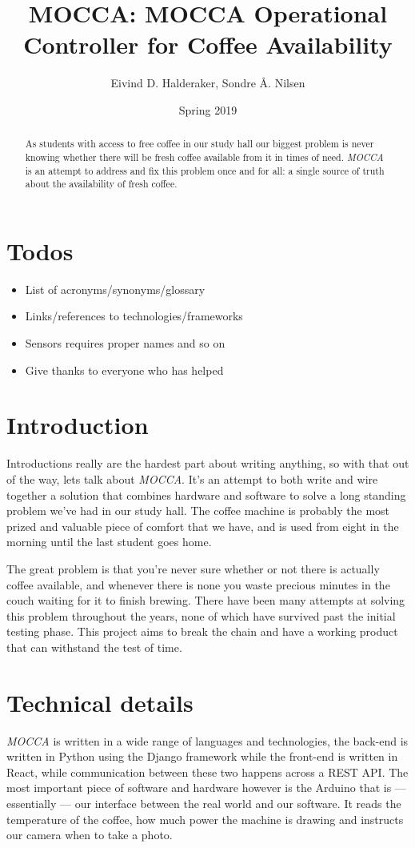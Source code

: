 \documentclass[12pt,a4paper,oneside,article]{memoir}
\title{MOCCA: MOCCA Operational Controller for Coffee Availability}
\author{Eivind D. Halderaker, Sondre Å. Nilsen}
\date{Spring 2019}
\numberwithin{equation}{chapter}
\begin{document}
\maketitle
\tableofcontents

\begin{abstract}
  As students with access to free coffee in our study hall our biggest problem
  is never knowing whether there will be fresh coffee available from it in times
  of need. \textit{MOCCA} is an attempt to address and fix this problem once and
  for all: a single source of truth about the availability of fresh coffee.
\end{abstract}

\section{Todos}
\begin{itemize}
\item List of acronyms/synonyms/glossary
\item Links/references to technologies/frameworks
\item Sensors requires proper names and so on
\item Give thanks to everyone who has helped
\end{itemize}

\section{Introduction}\label{sec:introduction}
Introductions really are the hardest part about writing anything, so with that
out of the way, lets talk about \textit{MOCCA}. It's an attempt to both write
and wire together a solution that combines hardware and software to solve a long
standing problem we've had in our study hall. The coffee machine is probably the
most prized and valuable piece of comfort that we have, and is used from eight
in the morning until the last student goes home.

The great problem is that you're never sure whether or not there is actually
coffee available, and whenever there is none you waste precious minutes in the
couch waiting for it to finish brewing. There have been many attempts at solving
this problem throughout the years, none of which have survived past the initial
testing phase. This project aims to break the chain and have a working product
that can withstand the test of time.

\section{Technical details}\label{sec:technical-details}
\textit{MOCCA} is written in a wide range of languages and technologies, the
back-end is written in Python using the Django framework while the front-end is
written in React, while communication between these two happens across a REST
API. The most important piece of software and hardware however is the Arduino
that is --- essentially --- our interface between the real world and our
software. It reads the temperature of the coffee, how much power the machine is
drawing and instructs our camera when to take a photo.
\end{document}

